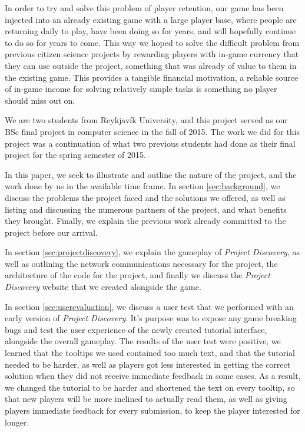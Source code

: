 In order to try and solve this problem of player retention, our game has been injected into an already existing game with a large player base, where people are returning daily to play, have been doing so for years, and will hopefully continue to do so for years to come. This way we hoped to solve the difficult problem from previous citizen science projects by rewarding players with in-game currency that they can use outside the project, something that was already of value to them in the existing game. This provides a tangible financial motivation, a reliable source of in-game income for solving relatively simple tasks is something no player should miss out on.

We are two students from Reykjavík University, and this project served as our BSc final project in computer science in the fall of 2015. The work we did for this project was a continuation of what two previous students had done as their final project for the spring semester of 2015. 

In this paper, we seek to illustrate and outline the nature of the project, and the work done by us in the available time frame. In section \ref{sec:background}, we discuss the problems the project faced and the solutions we offered, as well as listing and discussing the numerous partners of the project, and what benefits they brought. Finally, we explain the previous work already committed to the project before our arrival.

In section \ref{sec:projectdiscovery}, we explain the gameplay of \emph{Project Discovery}, as well as outlining the network communications necessary for the project, the architecture of the code for the project, and finally we discuss the \emph{Project Discovery} website that we created alongside the game. 

In section \ref{sec:userevaluation}, we discuss a user test that we performed with an early version of \emph{Project Discovery}. It's purpose was to expose any game breaking bugs and test the user experience of the newly created tutorial interface, alongside the overall gameplay. The results of the user test were positive, we learned that the tooltips we used contained too much text, and that the tutorial needed to be harder, as well as players got less interested in getting the correct solution when they did not receive immediate feedback in some cases. As a result, we changed the tutorial to be harder and shortened the text on every tooltip, so that new players will be more inclined to actually read them, as well as giving players immediate feedback for every submission, to keep the player interested for longer.

